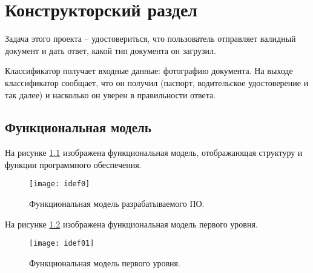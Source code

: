 \chapter{\textbf{Конструкторский раздел}}

Задача этого проекта -- удостовериться, что пользователь отправляет валидный документ и дать ответ, какой тип документа он загрузил. 

Классификатор получает входные данные: фотографию документа. На выходе классификатор сообщает, что он получил (паспорт, водительское удостоверение и так далее) и насколько он уверен в правильности ответа.

\newpage

\section{Функциональная модель}

На рисунке \ref{img:idef0} изображена функциональная модель, отображающая структуру и функции программного обеспечения. 

\begin{figure}[H]
	\centering
	\texttt{[image: idef0]}
	\caption{Функциональная модель разрабатываемого ПО. }
	\label{img:idef0}
\end{figure}

На рисунке \ref{img:idef01} изображена функциональная модель первого уровня. 

\begin{figure}[H]
	\centering
	\texttt{[image: idef01]}
	\caption{Функциональная модель первого уровня. }
	\label{img:idef01}
\end{figure}
